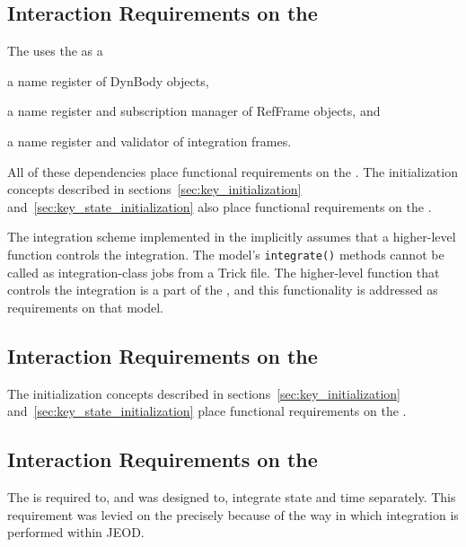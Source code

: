 \subsection{Interaction Requirements on the \DYNMANAGER}
The \ModelDesc uses the \DYNMANAGER as a \begin{inparaenum}[(1)]
\item a name register of DynBody objects,
\item a name register and subscription manager of RefFrame objects, and
\item a name register and validator of integration frames.
\end{inparaenum}
All of these dependencies place functional requirements on the \DYNMANAGER.
The initialization concepts described in sections~\ref{sec:key_initialization}
and~\ref{sec:key_state_initialization} also place functional requirements on
the \DYNMANAGER.

The integration scheme implemented in the \ModelDesc implicitly assumes that a
higher-level function controls the integration. The model's \verb+integrate()+
methods cannot be called as integration-class jobs from a Trick \Sdefine file.
The higher-level function that controls the integration is a part of the
\DYNMANAGER, and this functionality is addressed as requirements on that model.

\subsection{Interaction Requirements on the \BODYACTION}
The initialization concepts described in sections~\ref{sec:key_initialization}
and~\ref{sec:key_state_initialization} place functional requirements on
the \BODYACTION.

\subsection{Interaction Requirements on the \INTEGRATION}
The \INTEGRATION is required to, and was designed to, integrate state and time
separately. This requirement was levied on the \INTEGRATION precisely
because of the way in which integration is performed within JEOD.
